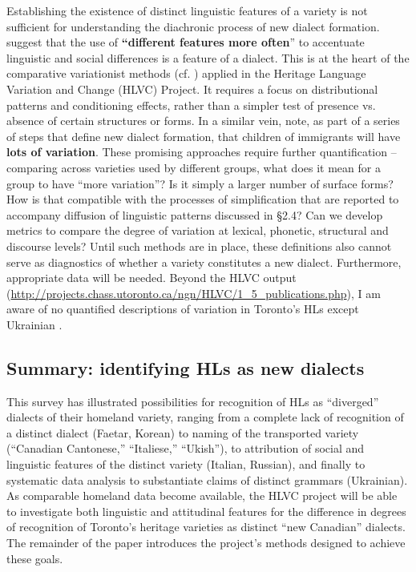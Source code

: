 \documentclass[output=paper]{LSP/langsci}
\begin{document}
Establishing the existence of distinct linguistic features of a variety is not sufficient for understanding the diachronic process of new dialect formation. \citet[6]{auer_study_2004} suggest that the use of\textbf{ “}\textbf{different features more often}”\textbf{ }to accentuate linguistic and social differences is a feature of a dialect. This is at the heart of the comparative variationist methods (cf. \citealt{cacoullos_testing_2010}) applied in the Heritage Language Variation and Change (HLVC) Project. It requires a focus on distributional patterns and conditioning effects, rather than a simpler test of presence vs. absence of certain structures or forms. In a similar vein, \citet[215]{auer_birth_2004} note, as part of a series of steps that define new dialect formation, that children of immigrants will have \textbf{lots of variation}. These promising approaches require further quantification – comparing across varieties used by different groups, what does it mean for a group to have “more variation”? Is it simply a larger number of surface forms? How is that compatible with the processes of simplification that are reported to accompany diffusion of linguistic patterns discussed in §2.4? Can we develop metrics to compare the degree of variation at lexical, phonetic, structural and discourse levels? Until such methods are in place, these definitions also cannot serve as diagnostics of whether a variety constitutes a new dialect. Furthermore, appropriate data will be needed. Beyond the HLVC output (\url{http://projects.chass.utoronto.ca/ngn/HLVC/1_5_publications.php}), I am aware of no quantified descriptions of variation in Toronto’s HLs except Ukrainian \citep{budzhak-jones_variable_1994,chumak-horbatsch_language_1987}. 

\subsection{Summary: identifying HLs as new dialects}

This survey has illustrated possibilities for recognition of HLs as “diverged” dialects of their homeland variety, ranging from a complete lack of recognition of a distinct dialect (Faetar, Korean) to naming of the transported variety (“Canadian Cantonese,” “Italiese,” “Ukish”), to attribution of social and linguistic features of the distinct variety (Italian, Russian), and finally to systematic data analysis to substantiate claims of distinct grammars (Ukrainian). As comparable homeland data become available, the HLVC project will be able to investigate both linguistic and attitudinal features for the difference in degrees of recognition of Toronto’s heritage varieties as distinct “new Canadian” dialects. The remainder of the paper introduces the project’s methods designed to achieve these goals.
\end{document}
